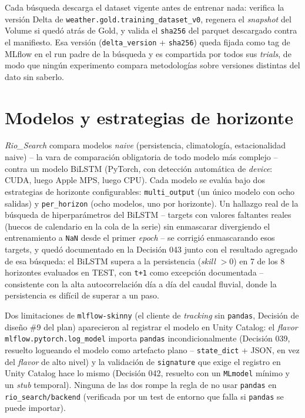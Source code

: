 Cada b\'usqueda descarga el dataset vigente antes de entrenar nada: verifica la versi\'on Delta de
\texttt{weather.gold.training\_dataset\_v0}, regenera el \emph{snapshot} del Volume si qued\'o
atr\'as de Gold, y valida el \texttt{sha256} del parquet descargado contra el manifiesto. Esa
versi\'on (\texttt{delta\_version} + \texttt{sha256}) queda fijada como tag de MLflow en el run
padre de la b\'usqueda y es compartida por todos sus \emph{trials}, de modo que ning\'un
experimento compara metodolog\'ias sobre versiones distintas del dato sin saberlo.

\section{Modelos y estrategias de horizonte}

\emph{Rio\_Search} compara modelos \emph{naive} (persistencia, climatolog\'ia, estacionalidad
naive) -- la vara de comparaci\'on obligatoria de todo modelo m\'as complejo -- contra un modelo
BiLSTM (PyTorch, con detecci\'on autom\'atica de \emph{device}: CUDA, luego Apple MPS, luego CPU).
Cada modelo se eval\'ua bajo dos estrategias de horizonte configurables: \texttt{multi\_output} (un
\'unico modelo con ocho salidas) y \texttt{per\_horizon} (ocho modelos, uno por horizonte). Un
hallazgo real de la b\'usqueda de hiperpar\'ametros del BiLSTM -- targets con valores faltantes
reales (huecos de calendario en la cola de la serie) sin enmascarar divergiendo el entrenamiento a
\texttt{NaN} desde el primer \emph{epoch} -- se corrigi\'o enmascarando esos targets, y qued\'o
documentado en la Decisi\'on 043 junto con el resultado agregado de esa b\'usqueda: el BiLSTM
supera a la persistencia (\emph{skill} $>0$) en 7 de los 8 horizontes evaluados en TEST, con
\texttt{t+1} como excepci\'on documentada -- consistente con la alta autocorrelaci\'on d\'ia a
d\'ia del caudal fluvial, donde la persistencia es dif\'icil de superar a un paso.

Dos limitaciones de \texttt{mlflow-skinny} (el cliente de \emph{tracking} sin \texttt{pandas},
Decisi\'on de dise\~no \#9 del plan) aparecieron al registrar el modelo en Unity Catalog: el
\emph{flavor} \texttt{mlflow.pytorch.log\_model} importa \texttt{pandas} incondicionalmente
(Decisi\'on 039, resuelto logueando el modelo como artefacto plano -- \texttt{state\_dict} +
JSON, en vez del \emph{flavor} de alto nivel) y la validaci\'on de \texttt{signature} que exige el
registro en Unity Catalog hace lo mismo (Decisi\'on 042, resuelto con un \texttt{MLmodel} m\'inimo
y un \emph{stub} temporal). Ninguna de las dos rompe la regla de no usar \texttt{pandas} en
\texttt{rio\_search/backend} (verificada por un test de entorno que falla si \texttt{pandas} se
puede importar).

